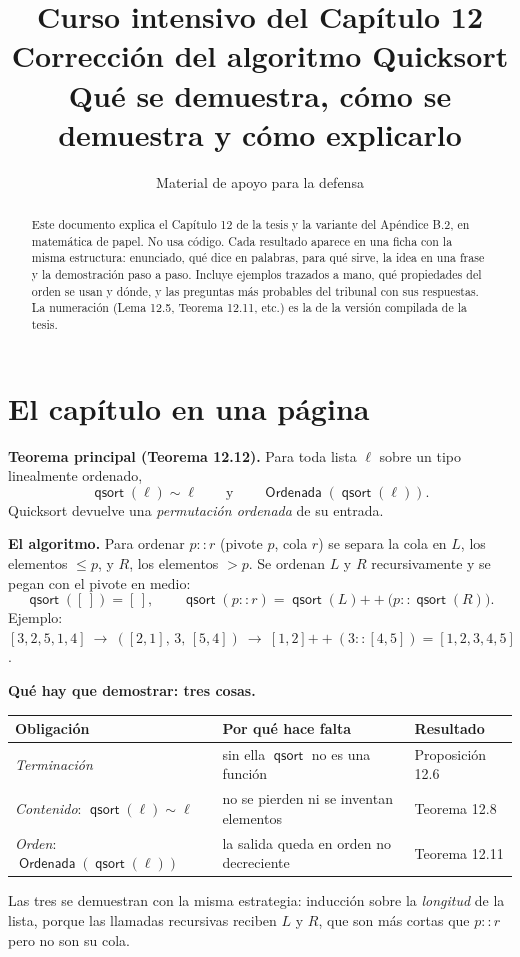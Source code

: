 \documentclass[11pt,a4paper]{article}
\title{\textbf{Curso intensivo del Capítulo 12}\\[4pt]
  \Large Corrección del algoritmo Quicksort\\[2pt]
  \large Qué se demuestra, cómo se demuestra y cómo explicarlo}
\author{Material de apoyo para la defensa}
\date{}
\newcommand{\Perm}{\sim}
\newcommand{\concat}{\mathbin{+\!\!+}}
\newcommand{\qs}{\operatorname{\mathsf{qsort}}}
\newcommand{\Sorted}{\operatorname{\mathsf{Ordenada}}}
\begin{document}
\maketitle
\thispagestyle{empty}

\begin{abstract}
\noindent
Este documento explica el Capítulo 12 de la tesis y la variante del
Apéndice B.2, en matemática de papel. No usa código. Cada resultado aparece en
una ficha con la misma estructura: enunciado, qué dice en palabras, para qué
sirve, la idea en una frase y la demostración paso a paso. Incluye ejemplos
trazados a mano, qué propiedades del orden se usan y dónde, y las preguntas
más probables del tribunal con sus respuestas. La numeración (Lema 12.5,
Teorema 12.11, etc.) es la de la versión compilada de la tesis.
\end{abstract}

\tableofcontents
\newpage

\section{El capítulo en una página}

\begin{clave}
\centering
\textbf{Teorema principal (Teorema 12.12).}\quad
Para toda lista \(\ell\) sobre un tipo linealmente ordenado,
\[
\qs(\ell)\Perm\ell\qquad\text{y}\qquad\Sorted(\qs(\ell)).
\]
Quicksort devuelve una \emph{permutación ordenada} de su entrada.
\end{clave}

\textbf{El algoritmo.} Para ordenar \(p::r\) (pivote \(p\), cola \(r\)) se
separa la cola en \(L\), los elementos \(\leq p\), y \(R\), los elementos
\(>p\). Se ordenan \(L\) y \(R\) recursivamente y se pegan con el pivote en
medio:
\[
\qs([\,])=[\,],\qquad
\qs(p::r)=\qs(L)\concat\big(p::\qs(R)\big).
\]
Ejemplo: \([3,2,5,1,4]\ \to\ ([2,1],\,3,\,[5,4])\ \to\ [1,2]\concat(3::[4,5])=[1,2,3,4,5]\).

\textbf{Qué hay que demostrar: tres cosas.}
\begin{center}
\renewcommand{\arraystretch}{1.3}
\begin{tabular}{@{}lll@{}}
\toprule
\textbf{Obligación} & \textbf{Por qué hace falta} & \textbf{Resultado}\\
\midrule
\emph{Terminación} & sin ella \(\qs\) no es una función & Proposición 12.6\\
\emph{Contenido}: \(\qs(\ell)\Perm\ell\) & no se pierden ni se inventan elementos & Teorema 12.8\\
\emph{Orden}: \(\Sorted(\qs(\ell))\) & la salida queda en orden no decreciente & Teorema 12.11\\
\bottomrule
\end{tabular}
\end{center}
Las tres se demuestran con la misma estrategia: inducción sobre la
\emph{longitud} de la lista, porque las llamadas recursivas reciben \(L\) y
\(R\), que son más cortas que \(p::r\) pero no son su cola.
\end{document}
